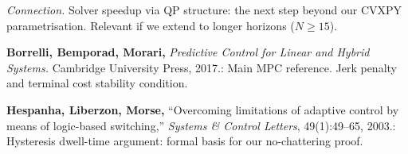 \documentclass[12pt,a4paper]{article}
\begin{document}
\begin{enumerate}[label={[\arabic*]}, leftmargin=1.5cm, itemsep=10pt]
  \textit{Connection.}
  Solver speedup via QP structure: the next step beyond our CVXPY
  parametrisation. Relevant if we extend to longer horizons ($N \geq 15$).

  \medskip

  \item \textbf{Borrelli, Bemporad, Morari,} \textit{Predictive Control for
    Linear and Hybrid Systems.} Cambridge University Press, 2017.:
    Main MPC reference. Jerk penalty and terminal cost stability condition.

  \item \textbf{Hespanha, Liberzon, Morse,} ``Overcoming limitations of
    adaptive control by means of logic-based switching,''
    \textit{Systems \& Control Letters}, 49(1):49--65, 2003.:
    Hysteresis dwell-time argument: formal basis for our no-chattering proof.

\end{enumerate}
\end{document}
